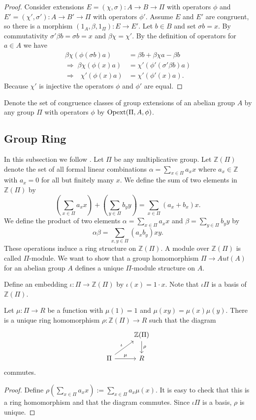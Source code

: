 \begin{proof}
Consider extensions $E=(\chi,\sigma):A\to B\to \Pi$ with operators $\phi$ and $E'=(\chi',\sigma'):A\to B'\to \Pi$ with operators $\phi'$.
Assume $E$ and $E'$ are congruent, so there is a morphism $(1_A,\beta,1_{\Pi}):E \to E'$.
Let $b\in B$ and set $\sigma b = x$.
By commutativity $\sigma' \beta b = \sigma b = x$ and $\beta \chi = \chi'$.
By the definition of operators for $a\in A$ we have
\begin{align*}
\beta \chi (\phi(\sigma b)a) &= \beta b + \beta \chi a - \beta b \\
\Longrightarrow \; \beta \chi (\phi(x)a) &= \chi' (\phi'(\sigma' \beta b)a)\\
\Longrightarrow \;\;\, \chi' (\phi(x)a) &= \chi' (\phi'(x)a).
\end{align*}
Because $\chi'$ is injective the operators $\phi$ and $\phi'$ are equal.
\end{proof}
Denote the set of congruence classes of  group extensions of an abelian group $A$ by any group $\Pi$ with operators $\phi$ by $\operatorname{Opext}(\Pi,A,\phi)$.
\subsection{Group Ring}
In this subsection we follow \cite[Chapter 3.2.]{milies}.
Let $\Pi$ be any multiplicative group.
Let $\mathbb{Z}(\Pi)$ denote the set of all formal linear combinations
$\alpha = \sum_{x\in\Pi} a_x x$ where $a_x \in \mathbb{Z}$ with $a_x = 0$ for all but finitely many $x$.
We define the sum of two elements in $\mathbb{Z}(\Pi)$ by
\[
\left(\sum_{x\in\Pi} a_x x\right) + \left(\sum_{y\in\Pi} b_y y\right) = \sum_{x\in\Pi} (a_x + b_x) x.
\]
We define the product of two elements $\alpha=\sum_{x\in\Pi} a_x x$ and $\beta= \sum_{y\in\Pi} b_y y$ by
\[
\alpha\beta = \sum_{x,y\in\Pi} (a_x b_y) xy.
\]
These operations induce a ring structure on $\mathbb{Z}(\Pi)$.
A module over $\mathbb{Z}(\Pi)$ is called $\Pi$-module.
We want to show that a group homomorphism $\Pi\to Aut(A)$ for an abelian group $A$ defines a unique $\Pi$-module structure on $A$.

Define an embedding $\iota:\Pi \to \mathbb{Z}(\Pi)$ by $\iota(x)=1 \cdot x$.
Note that $\iota\Pi$ is a basis of $\mathbb{Z}(\Pi)$.

\begin{lemma}\cite[Proposition IV.1.1.]{maclane}
\label{lemma:universalproperty_groupring}
Let $\mu:\Pi \to R$ be a function with $\mu(1)=1$ and $\mu(xy)=\mu(x)\mu(y)$.
There is a unique ring homomorphism $\rho:\mathbb{Z}(\Pi)\to R$ such that the diagram
\[
\begin{tikzcd}
& \mathbb{Z}(\Pi) 
	\arrow{d}{\rho}
\\
\Pi 
	\arrow{ur}{\iota}
	\arrow{r}{\mu}
& R
\end{tikzcd}
\]
commutes.
\end{lemma}
\begin{proof}
Define $\rho(\sum_{x\in\Pi}a_x x):= \sum_{x\in\Pi}a_x \mu(x)$.
It is easy to check that this is a ring homomorphism and that the diagram commutes.
Since $\iota\Pi$ is a basis, $\rho$ is unique.
\end{proof}

